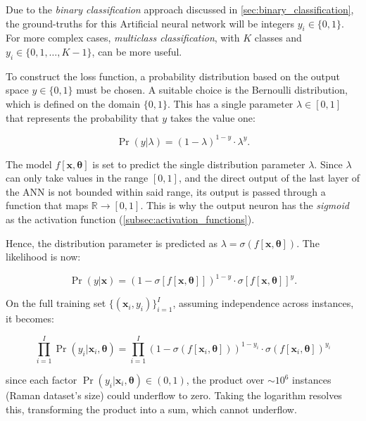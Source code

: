 Due to the \textit{binary classification} approach discussed in \cref{sec:binary_classification}, the ground-truths for this Artificial neural network will be integers $y_i\in\{0,1\}$. For more complex cases, \textit{multiclass classification}, with $K$ classes and $y_i\in\{0,1,\dots, K-1\}$, can be more useful.

To construct the loss function, a probability distribution based on the output space $y \in \{0,1\}$ must be chosen. A suitable choice is the Bernoulli distribution, which is defined on the domain $\{0,1\}$. This has a single parameter $\lambda \in [0,1]$ that represents the probability that $y$ takes the value one:

\begin{equation}
    \Pr(y|\lambda) = (1-\lambda)^{1-y} \cdot \lambda^y.
\end{equation}

The model $f[\mathbf{x}, \boldsymbol{\theta}]$ is set to predict the single distribution parameter $\lambda$. Since $\lambda$ can only take values in the range $[0,1]$, and the direct output of the last layer of the ANN is not bounded within said range, its output is passed through a function that maps $\mathbb{R} \rightarrow [0,1]$. This is why the output neuron has the \textit{sigmoid} as the activation function (\cref{subsec:activation_functions}).

Hence, the distribution parameter is predicted as $\lambda = \sigma(f[\mathbf{x}, \boldsymbol{\theta}])$. The likelihood is now:

\begin{equation}
    \Pr(y|\mathbf{x}) = (1 - \sigma[f[\mathbf{x}, \boldsymbol{\theta}]])^{1-y} \cdot \sigma[f[\mathbf{x}, \boldsymbol{\theta}]]^y.
\end{equation}

On the full training set $\{(\mathbf{x}_i, y_i)\}_{i=1}^{I}$, assuming independence across instances, it becomes:

\begin{equation}
    \prod_{i=1}^{I} \Pr(y_i | \mathbf{x}_i,
    \boldsymbol{\theta}) = \prod_{i=1}^{I} \left(1 - \sigma(f[\mathbf{x}_i,
    \boldsymbol{\theta}])\right)^{1-y_i} \cdot \sigma(f[\mathbf{x}_i,
    \boldsymbol{\theta}])^{y_i}
\end{equation}

since each factor $\Pr(y_i|\mathbf{x}_i, \boldsymbol{\theta}) \in (0,1)$, the product over $\sim10^6$ instances (Raman dataset's size) could underflow to zero. Taking the logarithm resolves this, transforming the product into a sum, which cannot underflow.

